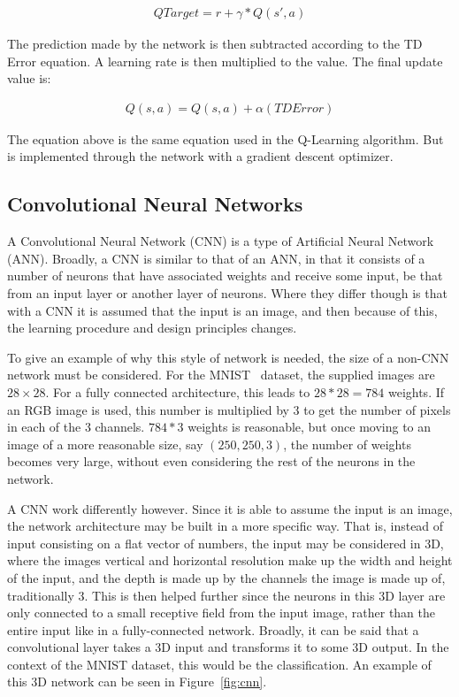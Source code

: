 \begin{align}
    QTarget = r + \gamma*Q(s',a)
\end{align}

The prediction made by the network is then
subtracted according to the TD Error equation. A learning rate is then
multiplied to the value. The final update value is:

\begin{align}
    Q(s,a) = Q(s,a) + \alpha (TDError)
\end{align}

The equation above is the same equation used in the Q-Learning algorithm. But
is implemented through the network with a gradient descent optimizer.

\subsection{Convolutional Neural Networks}

A Convolutional Neural Network (CNN) is a type of Artificial Neural Network
(ANN). Broadly, a CNN is similar to that of an ANN, in that it consists of a
number of neurons that have associated weights and receive some input, be that
from an input layer or another layer of neurons. Where they differ though is
that with a CNN it is assumed that the input is an image, and then because of
this, the learning procedure and design principles changes.

To give an example of why this style of network is needed, the size of a non-CNN
network must be considered. For the MNIST~\cite{lecun2010mnist} dataset, the
supplied images are $28 \times 28$. For a fully connected architecture, this
leads to $28 * 28 = 784$ weights. If an RGB image is used, this number is
multiplied by 3 to get the number of pixels in each of the 3 channels. $784 * 3$
weights is reasonable, but once moving to an image of a more reasonable size,
say $(250, 250, 3)$, the number of weights becomes very large, without even
considering the rest of the neurons in the network.

A CNN work differently however. Since it is able to assume the input is an
image, the network architecture may be built in a more specific way. That is,
instead of input consisting on a flat vector of numbers, the input may be
considered in 3D, where the images vertical and horizontal resolution make up
the width and height of the input, and the depth is made up by the channels the
image is made up of, traditionally 3. This is then helped further since the
neurons in this 3D layer are only connected to a small receptive field from the
input image, rather than the entire input like in a fully-connected network.
Broadly, it can be said that a convolutional layer takes a 3D input and
transforms it to some 3D output. In the context of the MNIST dataset, this
would be the classification. An example of this 3D network can be seen in
Figure~\ref{fig:cnn}.

